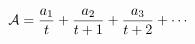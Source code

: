 \begin{equation}
{\cal{A}} =   \frac{a_1}{t} + \frac{a_2}{t+1} + \frac{a_3}{t+2} + \cdots
\label{tchn}
\end{equation}

